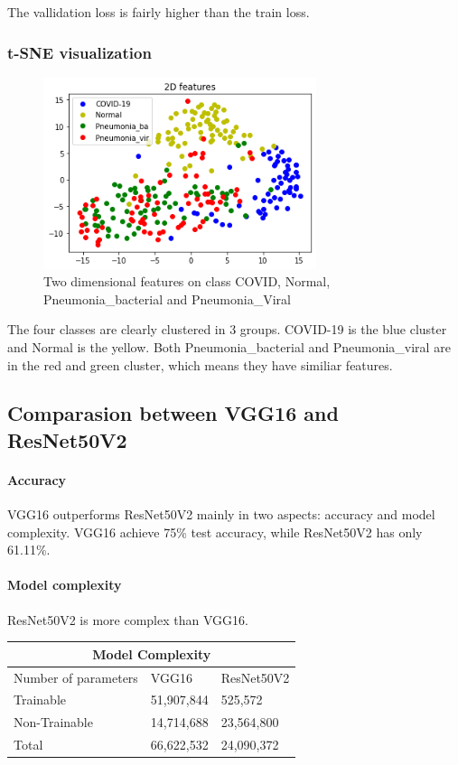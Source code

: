 \documentclass[a4paper,10pt]{article}
\begin{document}
The vallidation loss is fairly higher than the train loss.

\subsubsection{t-SNE visualization}
\begin{figure}[H]
  \centering
  \includegraphics[width=8cm]{./images/ResNet50V2-tsen.png}
     \caption{Two dimensional features on class COVID, Normal, Pneumonia\_bacterial and Pneumonia\_Viral}
        \label{task2-tsen}
\end{figure}

The four classes are clearly clustered in 3 groups. 
COVID-19 is the blue cluster and Normal is the yellow.
Both Pneumonia\_bacterial and Pneumonia\_viral are in the red and green cluster, 
which means they have similiar features.

\subsection{Comparasion between VGG16 and ResNet50V2}

\paragraph{Accuracy}

VGG16 outperforms ResNet50V2 mainly in two aspects: accuracy and model complexity. 
VGG16 achieve 75\% test accuracy, while ResNet50V2 has only 61.11\%. 

\paragraph{Model complexity}
ResNet50V2 is more complex than VGG16.

\hfill \break

\begin{tabular}{|p{4cm}|p{3cm}|p{3cm}|}
  
  \hline
  \multicolumn{3}{|c|}{Model Complexity} \\
  \hline
  Number of parameters & VGG16 &ResNet50V2\\
  \hline
  Trainable       & 51,907,844  & 525,572   \\
  Non-Trainable   & 14,714,688  & 23,564,800 \\
  Total           & 66,622,532  & 24,090,372  \\
  \hline
\end{tabular}
\end{document}
